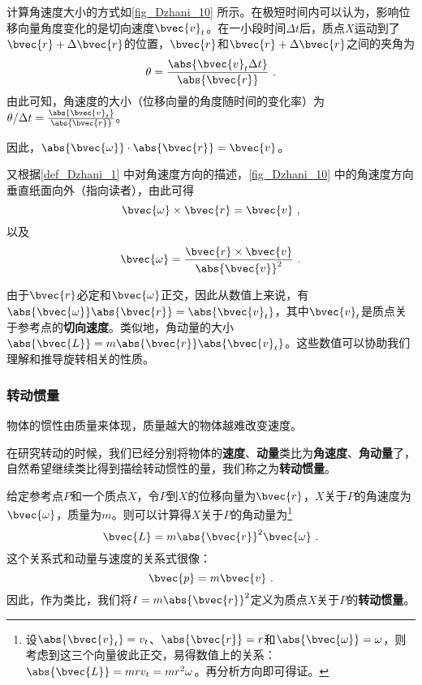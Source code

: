 计算角速度大小的方式如\autoref{fig_Dzhani_10} 所示。在极短时间内可以认为，影响位移向量角度变化的是切向速度$\bvec{v}_t$。在一小段时间$\Delta t$后，质点$X$运动到了$\bvec{r}+\Delta \bvec{r}$的位置，$\bvec{r}$和$\bvec{r}+\Delta \bvec{r}$之间的夹角为
\begin{equation}
\theta = \frac{\abs{\bvec{v}_t \Delta t}}{\abs{\bvec{r}}}~. 
\end{equation}
由此可知，角速度的大小（位移向量的角度随时间的变化率）为$\theta/\Delta t = \frac{\abs{\bvec{v}_t}}{\abs{\bvec{r}}}$。

因此，$\abs{\bvec{\omega}}\cdot\abs{\bvec{r}}=\bvec{v}$。

又根据\autoref{def_Dzhani_1} 中对角速度方向的描述，\autoref{fig_Dzhani_10} 中的角速度方向垂直纸面向外（指向读者），由此可得
\begin{equation}
\bvec{\omega}\times\bvec{r} = \bvec{v}~, 
\end{equation}
以及
\begin{equation}
\bvec{\omega} = \frac{\bvec{r}\times\bvec{v}}{\abs{\bvec{v}}^2}~. 
\end{equation}

由于$\bvec{r}$必定和$\bvec{\omega}$正交，因此从数值上来说，有$\abs{\bvec{\omega}}\abs{\bvec{r}}=\abs{\bvec{v}_t}$，其中$\bvec{v}_t$是质点关于参考点的\textbf{切向速度}。类似地，角动量的大小$\abs{\bvec{L}}=m\abs{\bvec{r}}\abs{\bvec{v}_t}$。这些数值可以协助我们理解和推导旋转相关的性质。



\subsubsection{转动惯量}



物体的惯性由质量来体现，质量越大的物体越难改变速度。


在研究转动的时候，我们已经分别将物体的\textbf{速度}、\textbf{动量}类比为\textbf{角速度}、\textbf{角动量}了，自然希望继续类比得到描绘转动惯性的量，我们称之为\textbf{转动惯量}。



给定参考点$P$和一个质点$X$，令$P$到$X$的位移向量为$\bvec{r}$，$X$关于$P$的角速度为$\bvec{\omega}$，质量为$m$。则可以计算得$X$关于$P$的角动量为\footnote{设$\abs{\bvec{v}_t}=v_t$、$\abs{\bvec{r}}=r$和$\abs{\bvec{\omega}}=\omega$，则考虑到这三个向量彼此正交，易得数值上的关系：$\abs{\bvec{L}}=mrv_t=m r^2 \omega$。再分析方向即可得证。}
\begin{equation}
\bvec{L} = m\abs{\bvec{r}}^2\bvec{\omega}~. 
\end{equation}
这个关系式和动量与速度的关系式很像：
\begin{equation}
\bvec{p} = m\bvec{v}~. 
\end{equation}
因此，作为类比，我们将$I=m\abs{\bvec{r}}^2$定义为质点$X$关于$P$的\textbf{转动惯量}。



